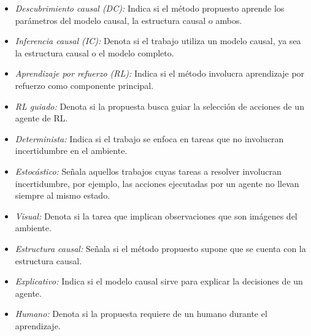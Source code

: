 \begin{itemize}
    \item \textit{Descubrimiento causal (DC):} Indica si el método propuesto aprende los parámetros del modelo causal, la estructura causal o ambos.
    \item \textit{Inferencia causal (IC):} Denota si el trabajo utiliza un modelo causal, ya sea la estructura causal o el modelo completo.
    \item \textit{Aprendizaje por refuerzo (RL):} Indica si el método involucra aprendizaje por refuerzo como componente principal.
    \item \textit{RL guiado:} Denota si la propuesta busca guiar la selección de acciones de un agente de RL.
    \item \textit{Determinista:} Indica si el trabajo se enfoca en tareas que no involucran incertidumbre en el ambiente.
    \item \textit{Estocástico:} Señala aquellos trabajos cuyas tareas a resolver  involucran incertidumbre, por ejemplo, las acciones ejecutadas por un agente no llevan siempre al mismo estado.
    \item \textit{Visual:} Denota si la tarea que implican observaciones que son imágenes del ambiente.
    \item \textit{Estructura causal:} Señala si el método propuesto supone que se cuenta con la estructura causal.
    \item \textit{Explicativo:} Indica si el modelo causal sirve para explicar la decisiones de un agente.
    \item \textit{Humano:} Denota si la propuesta requiere de un humano durante el aprendizaje.
\end{itemize}


